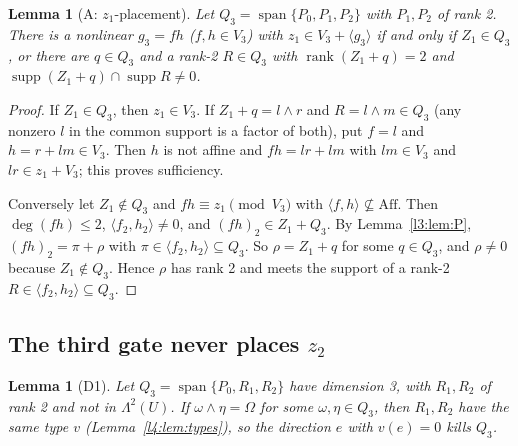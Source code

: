 \documentclass[11pt,a4paper]{article}
\theoremstyle{plain}
\newtheorem{lemma}[theorem]{Lemma}
\theoremstyle{remark}
\newcommand{\Aff}{\mathrm{Aff}}
\newcommand{\Span}{\operatorname{span}}
\newcommand{\supp}{\operatorname{supp}}
\newcommand{\rk}{\operatorname{rank}}
\newcommand{\Lam}{\Lambda^2}
\begin{document}
\begin{lemma}[A: $z_1$-placement]\label{l3:lem:A}
Let $Q_3=\Span\{P_0,P_1,P_2\}$ with $P_1,P_2$ of rank 2. There is a nonlinear $g_3=fh$ ($f,h\in V_3$) with $z_1\in V_3+\langle g_3\rangle$ if and only if $Z_1\in Q_3$, or there are $q\in Q_3$ and a rank-2 $R\in Q_3$ with $\rk(Z_1+q)=2$ and $\supp(Z_1+q)\cap\supp R\neq0$.
\end{lemma}

\begin{proof}
If $Z_1\in Q_3$, then $z_1\in V_3$. If $Z_1+q=l\wedge r$ and $R=l\wedge m\in Q_3$ (any nonzero $l$ in the common support is a factor of both), put $f=l$ and $h=r+lm\in V_3$. Then $h$ is not affine and $fh=lr+lm$ with $lm\in V_3$ and $lr\in z_1+V_3$; this proves sufficiency.

Conversely let $Z_1\notin Q_3$ and $fh\equiv z_1\pmod{V_3}$ with $\langle f,h\rangle\not\subseteq\Aff$. Then $\deg(fh)\le2$, $\langle f_2,h_2\rangle\neq0$, and $(fh)_2\in Z_1+Q_3$. By Lemma~\ref{l3:lem:P}, $(fh)_2=\pi+\rho$ with $\pi\in\langle f_2,h_2\rangle\subseteq Q_3$. So $\rho=Z_1+q$ for some $q\in Q_3$, and $\rho\neq0$ because $Z_1\notin Q_3$. Hence $\rho$ has rank 2 and meets the support of a rank-2 $R\in\langle f_2,h_2\rangle\subseteq Q_3$.
\end{proof}

\subsection[The third gate never places z2]{The third gate never places $z_2$}

\begin{lemma}[D1]\label{l3:lem:D1}
Let $Q_3=\Span\{P_0,R_1,R_2\}$ have dimension 3, with $R_1,R_2$ of rank 2 and not in $\Lam(U)$. If $\omega\wedge\eta=\Omega$ for some $\omega,\eta\in Q_3$, then $R_1,R_2$ have the same type $v$ (Lemma~\ref{l4:lem:types}), so the direction $e$ with $v(e)=0$ kills $Q_3$.
\end{lemma}
\end{document}
